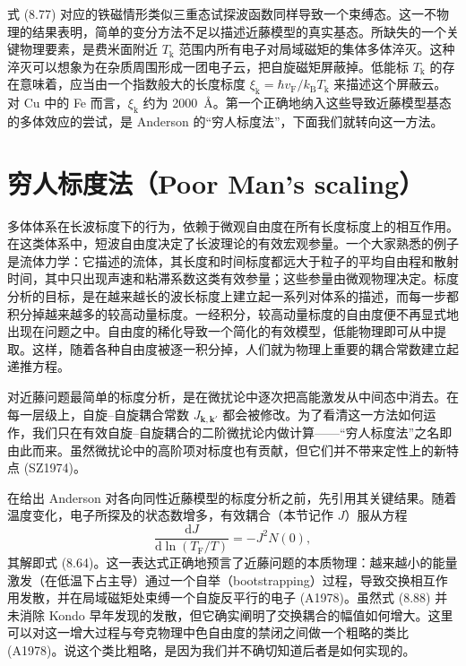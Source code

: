 式 (8.77) 对应的铁磁情形类似三重态试探波函数同样导致一个束缚态。这一不物理的结果表明，简单的变分方法不足以描述近藤模型的真实基态。所缺失的一个关键物理要素，是费米面附近 $T_{\mathrm{k}}$ 范围内所有电子对局域磁矩的集体多体淬灭。这种淬灭可以想象为在杂质周围形成一团电子云，把自旋磁矩屏蔽掉。低能标 $T_{\mathrm{k}}$ 的存在意味着，应当由一个指数般大的长度标度 $\xi_{\mathrm{k}} = \hbar v_{\mathrm{F}} / k_{\mathrm{B}} T_{\mathrm{k}}$ 来描述这个屏蔽云。对 Cu 中的 Fe 而言，$\xi_{\mathrm{k}}$ 约为 2000~\AA{}。第一个正确地纳入这些导致近藤模型基态的多体效应的尝试，是 Anderson 的“穷人标度法”，下面我们就转向这一方法。

\section{穷人标度法（Poor Man's scaling）}

多体体系在长波标度下的行为，依赖于微观自由度在所有长度标度上的相互作用。在这类体系中，短波自由度决定了长波理论的有效宏观参量。一个大家熟悉的例子是流体力学：它描述的流体，其长度和时间标度都远大于粒子的平均自由程和散射时间，其中只出现声速和粘滞系数这类有效参量；这些参量由微观物理决定。标度分析的目标，是在越来越长的波长标度上建立起一系列对体系的描述，而每一步都积分掉越来越多的较高动量标度。一经积分，较高动量标度的自由度便不再显式地出现在问题之中。自由度的稀化导致一个简化的有效模型，低能物理即可从中提取。这样，随着各种自由度被逐一积分掉，人们就为物理上重要的耦合常数建立起递推方程。

对近藤问题最简单的标度分析，是在微扰论中逐次把高能激发从中间态中消去。在每一层级上，自旋--自旋耦合常数 $J_{\mathbf{k},\mathbf{k}'}$ 都会被修改。为了看清这一方法如何运作，我们只在有效自旋--自旋耦合的二阶微扰论内做计算——“穷人标度法”之名即由此而来。虽然微扰论中的高阶项对标度也有贡献，但它们并不带来定性上的新特点 (SZ1974)。

在给出 Anderson 对各向同性近藤模型的标度分析之前，先引用其关键结果。随着温度变化，电子所探及的状态数增多，有效耦合（本节记作 $J$）服从方程
\begin{equation*}
\frac{\mathrm{d}J}{\mathrm{d}\ln(T_{\mathrm{F}}/T)} = -J^{2}N(0),
\tag{8.88}
\end{equation*}
其解即式 (8.64)。这一表达式正确地预言了近藤问题的本质物理：越来越小的能量激发（在低温下占主导）通过一个自举（bootstrapping）过程，导致交换相互作用发散，并在局域磁矩处束缚一个自旋反平行的电子 (A1978)。虽然式 (8.88) 并未消除 Kondo 早年发现的发散，但它确实阐明了交换耦合的幅值如何增大。这里可以对这一增大过程与夸克物理中色自由度的禁闭之间做一个粗略的类比 (A1978)。说这个类比粗略，是因为我们并不确切知道后者是如何实现的。

